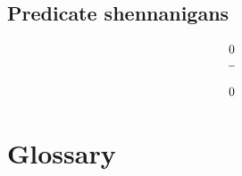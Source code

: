 \documentclass[a4paper]{article}
\newcommand{\n}{\\[1.5ex] \hline \nonumber \\[0ex]}
\newcommand*\features{}
\begin{document}
\subsection{Predicate shennanigans}
\begin{tcolorbox}
\begin{align}
   0
\n 0
\end{align}
\end{tcolorbox}

\section{Glossary}
\begin{multicols}{4}
\features
\end{multicols}


\end{document}
